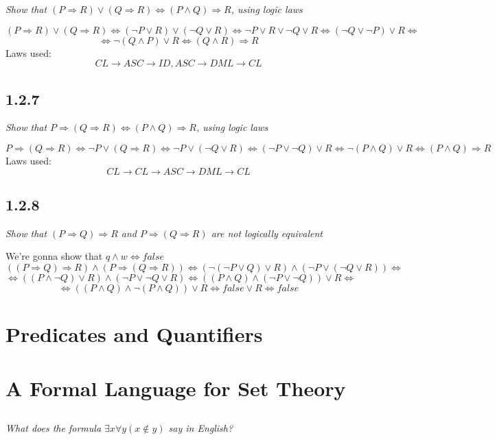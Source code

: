 \documentclass[11pt,oneside,titlepage]{book}
\DeclareMathOperator \eqv {\Leftrightarrow}
\DeclareMathOperator \imp {\Rightarrow}
\begin{document}
\textit{Show that $(P \imp R) \lor (Q \imp R) \eqv (P \land Q) \imp R$, using logic laws}

$$(P \imp R) \lor (Q \imp R)  \eqv (\neg P \lor R) \lor (\neg Q \lor R) \eqv
\neg P \lor R \lor \neg Q \lor R \eqv (\neg Q \lor \neg P) \lor R \eqv$$
$$ \eqv \neg (Q \land P) \lor R
\eqv (Q \land R) \imp R$$
Laws used:
$$CL \to ASC \to ID, ASC \to DML \to CL$$

\subsection*{1.2.7}

\textit{Show that $P \imp (Q \imp R) \eqv (P \land Q) \imp R$, using logic laws}

$$P \imp (Q \imp R) \eqv \neg P \lor (Q \imp R) \eqv \neg P \lor (\neg Q \lor R) \eqv
(\neg P \lor \neg Q) \lor R \eqv \neg (P \land Q) \lor R \eqv (P \land Q) \imp R$$
Laws used:
$$CL \to CL \to ASC \to DML \to CL$$

\subsection*{1.2.8}

\textit{Show that $(P \imp Q) \imp R$ and $P \imp (Q \imp R)$ are not logically equivalent}

We're gonna show that $q \land w \eqv false$
$$((P \imp Q) \imp R) \land (P \imp (Q \imp R)) \eqv (\neg (\neg P \lor Q) \lor R) \land
(\neg P \lor (\neg Q \lor R)) \eqv $$
$$\eqv ((P \land \neg Q) \lor R) \land (\neg P \lor \neg Q \lor R) \eqv
((P \land Q) \land (\neg P \lor \neg Q)) \lor R  \eqv$$
$$ \eqv ((P \land Q) \land \neg ( P \land  Q)) \lor R  \eqv false \lor R \eqv false$$


\section{Predicates and Quantifiers}

\section{A Formal Language for Set Theory}

\subsection{}

\textit{What does the formula $\exists x \forall y (x \notin y)$ say in English? }
\end{document}
